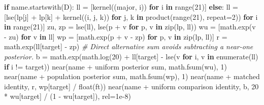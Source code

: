\documentclass[
]{article}
\newenvironment{Shaded}{}{}
\newcommand{\BuiltInTok}[1]{\textcolor[rgb]{0.00,0.50,0.00}{#1}}
\newcommand{\CommentTok}[1]{\textcolor[rgb]{0.38,0.63,0.69}{\textit{#1}}}
\newcommand{\ControlFlowTok}[1]{\textcolor[rgb]{0.00,0.44,0.13}{\textbf{#1}}}
\newcommand{\DecValTok}[1]{\textcolor[rgb]{0.25,0.63,0.44}{#1}}
\newcommand{\FloatTok}[1]{\textcolor[rgb]{0.25,0.63,0.44}{#1}}
\newcommand{\KeywordTok}[1]{\textcolor[rgb]{0.00,0.44,0.13}{\textbf{#1}}}
\newcommand{\NormalTok}[1]{#1}
\newcommand{\OperatorTok}[1]{\textcolor[rgb]{0.40,0.40,0.40}{#1}}
\newcommand{\StringTok}[1]{\textcolor[rgb]{0.25,0.44,0.63}{#1}}
\begin{document}
\begin{Shaded}
\begin{Highlighting}[]
        \ControlFlowTok{if}\NormalTok{ name.startswith(}\StringTok{\textquotesingle{}D\textquotesingle{}}\NormalTok{):}
\NormalTok{            ll }\OperatorTok{=}\NormalTok{ [kernel((major, i)) }\ControlFlowTok{for}\NormalTok{ i }\KeywordTok{in} \BuiltInTok{range}\NormalTok{(}\DecValTok{21}\NormalTok{)]}
        \ControlFlowTok{else}\NormalTok{:}
\NormalTok{            ll }\OperatorTok{=}\NormalTok{ [lse(lp[j] }\OperatorTok{+}\NormalTok{ lp[k] }\OperatorTok{+}\NormalTok{ kernel((i, j, k))}
                      \ControlFlowTok{for}\NormalTok{ j, k }\KeywordTok{in}\NormalTok{ product(}\BuiltInTok{range}\NormalTok{(}\DecValTok{21}\NormalTok{), repeat}\OperatorTok{=}\DecValTok{2}\NormalTok{)) }\ControlFlowTok{for}\NormalTok{ i }\KeywordTok{in} \BuiltInTok{range}\NormalTok{(}\DecValTok{21}\NormalTok{)]}
\NormalTok{        zu, zp }\OperatorTok{=}\NormalTok{ lse(ll), lse(p }\OperatorTok{+}\NormalTok{ v }\ControlFlowTok{for}\NormalTok{ p, v }\KeywordTok{in} \BuiltInTok{zip}\NormalTok{(lp, ll))}
\NormalTok{        wu }\OperatorTok{=}\NormalTok{ [math.exp(v }\OperatorTok{{-}}\NormalTok{ zu) }\ControlFlowTok{for}\NormalTok{ v }\KeywordTok{in}\NormalTok{ ll]}
\NormalTok{        wp }\OperatorTok{=}\NormalTok{ [math.exp(p }\OperatorTok{+}\NormalTok{ v }\OperatorTok{{-}}\NormalTok{ zp) }\ControlFlowTok{for}\NormalTok{ p, v }\KeywordTok{in} \BuiltInTok{zip}\NormalTok{(lp, ll)]}
\NormalTok{        r }\OperatorTok{=}\NormalTok{ math.exp(ll[target] }\OperatorTok{{-}}\NormalTok{ zp)}
        \CommentTok{\# Direct alternative sum avoids subtracting a near{-}one posterior.}
\NormalTok{        b }\OperatorTok{=}\NormalTok{ math.exp(math.log(}\DecValTok{20}\NormalTok{) }\OperatorTok{+}\NormalTok{ ll[target] }\OperatorTok{{-}}\NormalTok{ lse(v }\ControlFlowTok{for}\NormalTok{ i, v }\KeywordTok{in} \BuiltInTok{enumerate}\NormalTok{(ll) }\ControlFlowTok{if}\NormalTok{ i }\OperatorTok{!=}\NormalTok{ target))}
\NormalTok{        near(name }\OperatorTok{+} \StringTok{\textquotesingle{} uniform posterior sum\textquotesingle{}}\NormalTok{, math.fsum(wu), }\DecValTok{1}\NormalTok{)}
\NormalTok{        near(name }\OperatorTok{+} \StringTok{\textquotesingle{} population posterior sum\textquotesingle{}}\NormalTok{, math.fsum(wp), }\DecValTok{1}\NormalTok{)}
\NormalTok{        near(name }\OperatorTok{+} \StringTok{\textquotesingle{} matched identity\textquotesingle{}}\NormalTok{, r, wp[target] }\OperatorTok{/} \BuiltInTok{float}\NormalTok{(ft))}
\NormalTok{        near(name }\OperatorTok{+} \StringTok{\textquotesingle{} uniform comparison identity\textquotesingle{}}\NormalTok{, b, }\DecValTok{20} \OperatorTok{*}\NormalTok{ wu[target] }\OperatorTok{/}\NormalTok{ (}\DecValTok{1} \OperatorTok{{-}}\NormalTok{ wu[target]), rel}\OperatorTok{=}\FloatTok{1e{-}8}\NormalTok{)}

\end{Highlighting}
\end{Shaded}
\end{document}

